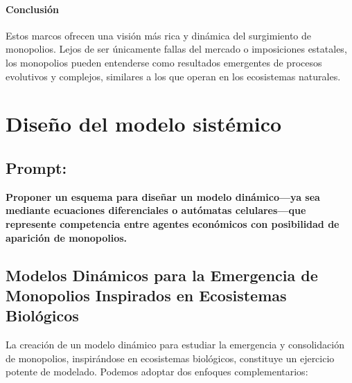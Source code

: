 \documentclass[a4paper,12pt]{article}
\begin{document}
\paragraph{Conclusión} Estos marcos ofrecen una visión más rica y dinámica del surgimiento de monopolios. Lejos de ser únicamente fallas del mercado o imposiciones estatales, los monopolios pueden entenderse como resultados emergentes de procesos evolutivos y complejos, similares a los que operan en los ecosistemas naturales.

\section*{Diseño del modelo sistémico}
\subsection*{Prompt:}
\textbf{Proponer un esquema para diseñar un modelo dinámico—ya sea mediante ecuaciones diferenciales o autómatas celulares—que represente competencia entre agentes económicos con posibilidad de aparición de monopolios.}
\subsection*{Modelos Dinámicos para la Emergencia de Monopolios Inspirados en Ecosistemas Biológicos}

La creación de un modelo dinámico para estudiar la emergencia y consolidación de monopolios, inspirándose en ecosistemas biológicos, constituye un ejercicio potente de modelado. Podemos adoptar dos enfoques complementarios:
\end{document}
